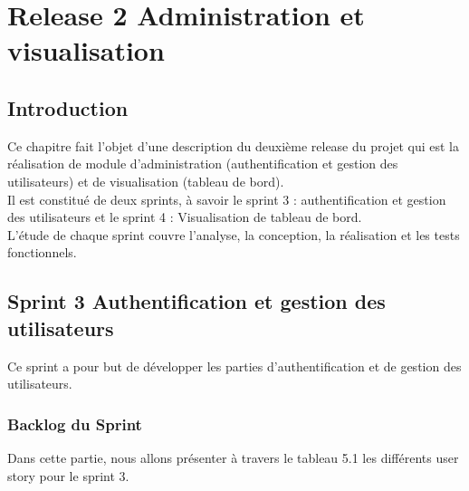 \chapter{Release 2 Administration et visualisation}

\section*{Introduction}
Ce chapitre fait l'objet d'une description du deuxième release du projet qui est la réalisation de
module d'administration (authentification et gestion des utilisateurs) et de visualisation (tableau de bord).\\
Il est constitué de deux sprints, à savoir le sprint 3 : authentification et gestion des utilisateurs et le sprint 4 : Visualisation de tableau de bord.\\
L'étude de chaque sprint couvre l'analyse, la conception, la réalisation et les tests fonctionnels.
\section{Sprint 3 Authentification et gestion des utilisateurs}
Ce sprint a pour but de développer les parties d'authentification et de gestion des utilisateurs.
\subsection{Backlog du Sprint}
Dans cette partie, nous allons présenter à travers le tableau 5.1 les différents user story pour le sprint 3.

